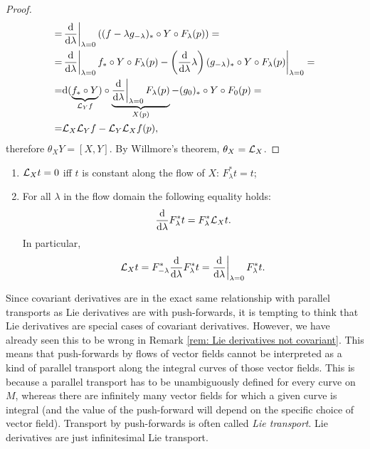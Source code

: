 \begin{proof}
\begin{align}
        =&\restr{\frac{\dd}{\dd \lambda}}{\lambda=0} \left((f-\lambda g_{-\lambda})_\ast\circ Y\circ F_\lambda(p)\right)=\\
        =&\restr{\frac{\dd}{\dd \lambda}}{\lambda=0} f_\ast\circ Y\circ F_\lambda (p)-\restr{\left(\frac{\dd}{\dd \lambda}\lambda\right)(g_{-\lambda})_\ast\circ Y\circ F_\lambda(p)}{\lambda=0}=\\
        =&\dd(\underbrace{f_\ast\circ Y}_{\Lie_Yf})\circ \underbrace{\restr{\frac{\dd}{\dd \lambda}}{\lambda=0} F_\lambda(p)}_{X(p)}-(g_0)_\ast \circ Y\circ F_0(p)=\\
        =&\Lie_X\Lie_Y f-\Lie_Y\Lie_X f(p),
    \end{align}
    therefore $\theta_X Y=[X,Y]$. By Willmore's theorem, $\theta_X=\mathcal{L}_X$.
\end{proof}
\begin{cor}
\begin{enumerate}
    \item $\mathcal{L}_X t=0$ iff $t$ is constant along the flow of $X$: $F^\ast_\lambda t=t$;
    \item For all $\lambda$ in the flow domain the following equality holds:
    \[\frac{{\mathrm{d}}}{{\mathrm{d}} \lambda}F^\ast_\lambda t=F^\ast_\lambda \mathcal{L}_X t.\]
    In particular, 
    \[\Lie_X t=F^\ast_{-\lambda} \frac{\dd}{\dd \lambda}F^\ast_\lambda t=\restr{\frac{\dd}{\dd\lambda}}{\lambda=0}F^\ast_\lambda t.\]
\end{enumerate}
\end{cor}

\begin{rem}
    Since covariant derivatives are in the exact same relationship with parallel transports as Lie derivatives are with push-forwards, it is tempting to think that Lie derivatives are special cases of covariant derivatives. However, we have already seen this to be wrong in Remark \ref{rem: Lie derivatives not covariant}. This means that push-forwards by flows of vector fields cannot be interpreted as a kind of parallel transport along the integral curves of those vector fields. This is because a parallel transport has to be unambiguously defined for every curve on $M$, whereas there are infinitely many vector fields for which a given curve is integral (and the value of the push-forward will depend on the specific choice of vector field). Transport by push-forwards is often called \emph{Lie transport}. Lie derivatives are just infinitesimal Lie transport.
\end{rem}


